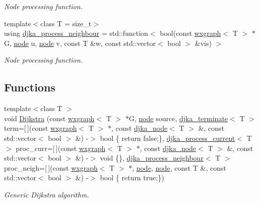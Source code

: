 \begin{DoxyCompactItemize}
\begin{DoxyCompactList}\small\item\em Node processing function. \end{DoxyCompactList}\item 
{\footnotesize template$<$class T  = size\+\_\+t$>$ }\\using \hyperlink{namespacelgraph_1_1traversal_1_1dijkstra_a5e5d24edba3465d838a24b322a9d2a56}{djka\+\_\+process\+\_\+neighbour} = std\+::function$<$ bool(const \hyperlink{classlgraph_1_1wxgraph}{wxgraph}$<$ T $>$ $\ast$G, \hyperlink{namespacelgraph_a397169dd66adf725210a30fb7251773e}{node} u, \hyperlink{namespacelgraph_a397169dd66adf725210a30fb7251773e}{node} v, const T \&w, const std\+::vector$<$ bool $>$ \&vis) $>$
\begin{DoxyCompactList}\small\item\em Node processing function. \end{DoxyCompactList}\end{DoxyCompactItemize}
\subsection*{Functions}
\begin{DoxyCompactItemize}
\item 
{\footnotesize template$<$class T $>$ }\\void \hyperlink{namespacelgraph_1_1traversal_1_1dijkstra_a52f3f5225b155a262b01914c63fb8819}{Dijkstra} (const \hyperlink{classlgraph_1_1wxgraph}{wxgraph}$<$ T $>$ $\ast$G, \hyperlink{namespacelgraph_a397169dd66adf725210a30fb7251773e}{node} source, \hyperlink{namespacelgraph_1_1traversal_1_1dijkstra_afd9f50c2503c09300fff1bd48fad3aae}{djka\+\_\+terminate}$<$ T $>$ term=\mbox{[}$\,$\mbox{]}(const \hyperlink{classlgraph_1_1wxgraph}{wxgraph}$<$ T $>$ $\ast$, const \hyperlink{namespacelgraph_1_1traversal_1_1dijkstra_ab54520d6f8049c8841128742624904a3}{djka\+\_\+node}$<$ T $>$ \&, const std\+::vector$<$ bool $>$ \&) -\/$>$ bool \{ return false;\}, \hyperlink{namespacelgraph_1_1traversal_1_1dijkstra_a6fd2792dd3d21438c17adc0187e99f66}{djka\+\_\+process\+\_\+current}$<$ T $>$ proc\+\_\+curr=\mbox{[}$\,$\mbox{]}(const \hyperlink{classlgraph_1_1wxgraph}{wxgraph}$<$ T $>$ $\ast$, const \hyperlink{namespacelgraph_1_1traversal_1_1dijkstra_ab54520d6f8049c8841128742624904a3}{djka\+\_\+node}$<$ T $>$ \&, const std\+::vector$<$ bool $>$ \&) -\/$>$ void \{\}, \hyperlink{namespacelgraph_1_1traversal_1_1dijkstra_a5e5d24edba3465d838a24b322a9d2a56}{djka\+\_\+process\+\_\+neighbour}$<$ T $>$ proc\+\_\+neigh=\mbox{[}$\,$\mbox{]}(const \hyperlink{classlgraph_1_1wxgraph}{wxgraph}$<$ T $>$ $\ast$, \hyperlink{namespacelgraph_a397169dd66adf725210a30fb7251773e}{node}, \hyperlink{namespacelgraph_a397169dd66adf725210a30fb7251773e}{node}, const T \&, const std\+::vector$<$ bool $>$ \&) -\/$>$ bool \{ return true;\})
\begin{DoxyCompactList}\small\item\em Generic Dijkstra algorithm. \end{DoxyCompactList}\end{DoxyCompactItemize}


